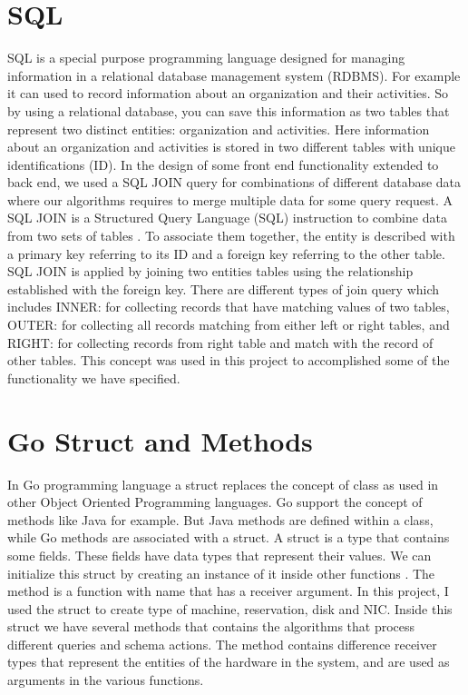 \section{SQL}
 SQL is a special purpose programming language designed for managing information in a relational database management system (RDBMS). For example it can used to record information about an organization and their activities. So by using a relational database, you can save this information as two tables that represent two distinct entities: organization and activities. Here information about an organization and activities is stored in two different tables with unique identifications (ID). In the design of some front end functionality extended to back end, we used a SQL JOIN query for combinations of different database data where our algorithms requires to merge multiple data for some query request. A SQL JOIN is a Structured Query Language (SQL) instruction to combine data from two sets of tables \cite{SQLJOIN}. To associate them together, the entity is described with a primary key referring to its ID and a foreign key referring to the other table. SQL JOIN is applied by joining two entities tables using the relationship established with the foreign key. There are different types of join query which includes INNER: for collecting records that have matching values of two tables, OUTER: for collecting all records matching from either left or right tables, and RIGHT: for collecting records from right table and match with the record of other tables. This concept was used in this project to accomplished some of the functionality we have specified.
\section{Go Struct and Methods} \label{gostruct}
In Go programming language a struct replaces the concept of class as used in other Object Oriented Programming languages. Go support the concept of methods like Java for example. But Java methods are defined within a class, while Go methods are associated with a struct. A struct is a type that contains some fields\cite{Struct}. These fields have data types that represent their values. We can initialize this struct by creating an instance of it inside other functions \cite{Method}. The method is a function with name that has a receiver argument. In this project, I used the struct to create type of machine, reservation, disk and NIC. Inside this struct we have several methods that contains the algorithms that process different  queries and schema actions. The method contains difference receiver types that represent the entities of the hardware in the system, and are used as arguments in the various functions. 



